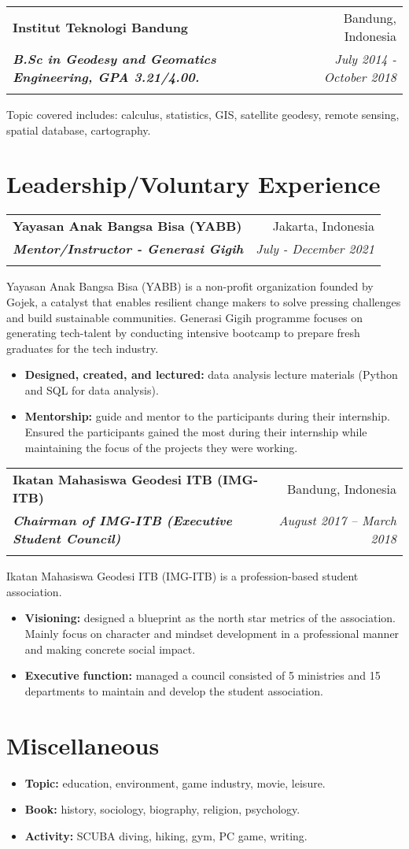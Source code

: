 \documentclass[a4paper, 11pt]{article}
\makeatletter
\newcommand{\resumeItem}[2]{
    \item\small{
        \textbf{#1}{#2 \vspace{-2pt}}
    }
}
\newcommand{\resumeSubheading}[4]{
    \vspace{-1pt}
    \begin{tabular*}{\textwidth}{l@{\extracolsep{\fill}}r}
        \color{lightblue}\textbf{#1} & #2 \\
        \textbf{\textit{\small#3}} & \textit{\small #4} \\
        \textnormal{}\vspace{-5pt}
    \end{tabular*}\vspace{-5pt}
}
\newcommand{\resumeItemListStart}{\begin{itemize}[leftmargin=*]\setlength\itemsep{0em}\vspace{-1pt}}
\newcommand{\resumeItemListEnd}{\end{itemize}\vspace{-5pt}}
\makeatother
\begin{document}
    \vspace{5pt}
    \resumeSubheading
    {Institut Teknologi Bandung}
    {Bandung, Indonesia}
    {B.Sc in Geodesy and Geomatics Engineering, GPA 3.21/4.00.}
    {July 2014 - October 2018}
    {Topic covered includes: calculus, statistics, GIS, satellite geodesy, 
    remote sensing, spatial database, cartography.}

    \vspace{-5pt}
    \section{Leadership/Voluntary Experience}

    \resumeSubheading
    {Yayasan Anak Bangsa Bisa (YABB)}
    {Jakarta, Indonesia}
    {Mentor/Instructor - Generasi Gigih}
    {July - December 2021}
    \small{Yayasan Anak Bangsa Bisa (YABB) is a non-profit organization founded by Gojek, a
    catalyst that enables resilient change makers to solve pressing challenges and build
    sustainable communities. Generasi Gigih programme focuses on generating tech-talent
    by conducting intensive bootcamp to prepare fresh graduates for the tech industry.}
    \vspace{-1pt}
    \resumeItemListStart
    \resumeItem{Designed, created, and lectured:}{ data analysis lecture materials (Python and SQL
    for data analysis).}
    \resumeItem{Mentorship:}{ guide and mentor to the participants during their
    internship. Ensured the participants gained the most during their
    internship while maintaining the focus of the projects they were working.}
    \resumeItemListEnd

    \vspace{5pt}
    \resumeSubheading
    {Ikatan Mahasiswa Geodesi ITB (IMG-ITB)}
    {Bandung, Indonesia}
    {Chairman of IMG-ITB (Executive Student Council)}
    {August 2017 – March 2018}
    \small{Ikatan Mahasiswa Geodesi ITB (IMG-ITB) is a profession-based student association.}
    \vspace{-1pt}
    \resumeItemListStart
    \resumeItem{Visioning:}{ designed a blueprint as the north star metrics of the
    association. Mainly focus on character and mindset development in a
    professional manner and making concrete social impact.}
    \resumeItem{Executive function:}{ managed a council consisted of 5 ministries and 15
    departments to maintain and develop the student association.}
    \resumeItemListEnd

    \vspace{-20pt}
    \section{Miscellaneous}

    \resumeItemListStart
    \resumeItem{Topic:}{ education, environment, game industry, movie, leisure.}
    \resumeItem{Book:}{ history, sociology, biography, religion, psychology.}
    \resumeItem{Activity:}{ SCUBA diving, hiking, gym, PC game, writing.}
    \resumeItemListEnd
\end{document}

